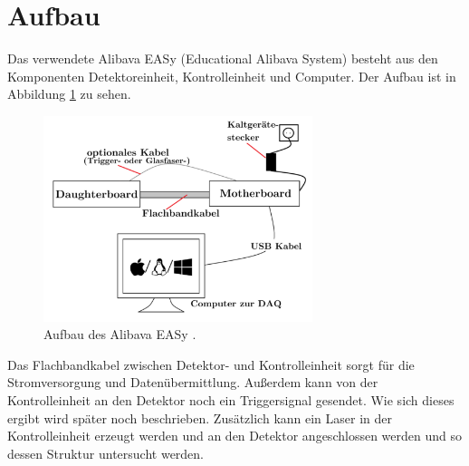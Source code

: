 \section{Aufbau}

Das verwendete Alibava EASy (Educational Alibava System) besteht aus den Komponenten Detektoreinheit, Kontrolleinheit und Computer.
Der Aufbau ist in Abbildung \ref{fig:aufbau} zu sehen.
\begin{figure}
  \centering
  \includegraphics[height=6cm]{TimosAufrisse/aufbau.png}
  \caption{Aufbau des Alibava EASy \cite{anleitung}.}
  \label{fig:aufbau}
\end{figure}
Das Flachbandkabel zwischen Detektor- und Kontrolleinheit sorgt für die Stromversorgung und Datenübermittlung. Außerdem kann von der Kontrolleinheit an den Detektor noch ein Triggersignal gesendet. Wie sich dieses ergibt wird später noch beschrieben. Zusätzlich kann ein Laser in der Kontrolleinheit erzeugt werden und an den Detektor angeschlossen werden und so dessen Struktur untersucht werden.

